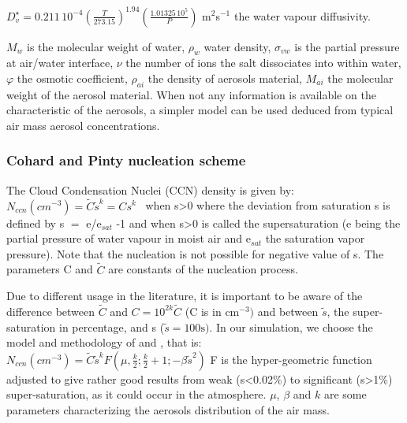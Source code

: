 $D_{v}^{\star }=0.211\, {10}^{-4}\left( \frac{T}{273.15} \right)^{1.94}\left(
\frac{1.01325\, {10}^{5}}{P} \right)$ m$^{2}$s$^{-1}$ the water vapour
diffusivity.

$M_{w}$ is the molecular weight of water, $\rho_{w}$ water density,
$\sigma_{vw}$ is the partial pressure at air/water interface,
\newline
$\nu $ the number of ions the salt dissociates into within water,
\newline
$\varphi $ the osmotic coefficient, $\rho_{ai}$ the density of aerosols material,
\newline
$M_{ai}$ the molecular weight of the aerosol material.
\newline
When not any information is available on the characteristic of the aerosols,
a simpler model can be used deduced from typical air mass aerosol
concentrations.

\subsubsection{Cohard and Pinty nucleation scheme}

The Cloud Condensation Nuclei (CCN) density is given by:
\newline
$N_{ccn}\left( {cm}^{-3} \right)=\tilde{C}\tilde{s}^{k}=Cs^{k}\, \, \, \, \,
$when s\textgreater 0
\newline
where the deviation from saturation s is defined by s $=$ e/e$_{sat}$ -1 and
\newline
when s\textgreater 0 is called the supersaturation (e being the partial
pressure of water vapour in moist air and e$_{sat}$ the saturation vapor
pressure). Note that the nucleation is not possible for negative value of s.
The parameters C and $\tilde{C}$ are constants of the nucleation
process.

Due to different usage in the literature, it is important to be aware of the
difference between $\tilde{C}$ and $C=10^{2k}\tilde{C}$ (C is in cm$^{-3})$ and
between $\tilde{s}$, the super-saturation in percentage, and s
($\tilde{s}=100\mbox{s})$.
\newline
\newline
In our simulation, we choose the model and methodology of
\cite{Cohard:1998} and \cite{Cohard:2000}, that is: $N_{ccn}\left(
{cm}^{-3} \right)=\tilde{C}\tilde{s}^{k}F\left( \mu
,\frac{k}{2};\frac{k}{2}+1;-\beta \tilde{s}^{2} \right)$
\newline
F is the hyper-geometric function adjusted to give rather good results from
weak (s\textless 0.02{\%}) to significant (s\textgreater 1{\%})
super-saturation, as it could occur in the atmosphere. $\mu$, $\beta $ and $k$ are
some parameters characterizing the aerosols distribution of the air mass.

